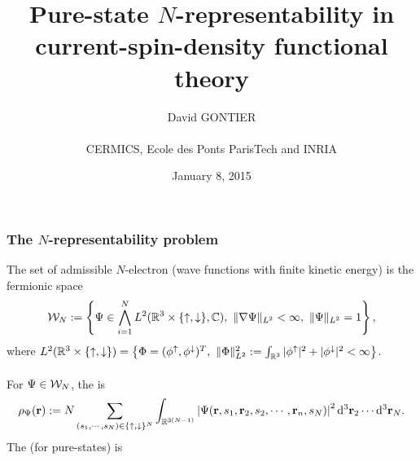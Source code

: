 \documentclass[9pt,xcolor=dvipsnames]{beamer}
\title[$N$-representability]{Pure-state $N$-representability in current-spin-density functional theory}
\author[David Gontier]{David GONTIER\\
~\\
CERMICS, Ecole des Ponts ParisTech and INRIA}
\date{January 8, 2015}
\begin{document}

\begin{frame} 
\titlepage
\end{frame} 



\begin{frame}

\frametitle{The $N$-representability problem}

The set of admissible $N$-electron  (wave functions with finite kinetic energy) is the fermionic space
\[
	{\mathcal W}_N := \left\{ \Psi \in \bigwedge_{i=1}^N L^2({\mathbb R}^3 \times \{ {\uparrow}, {\downarrow}\}, {\mathbb C}), \ \| \nabla \Psi \|_{L^2} < \infty, \  \| \Psi\|_{L^2} = 1 \right\},
\]
where $L^2({\mathbb R}^3 \times \{ {\uparrow}, {\downarrow}\} ) = \left\{ \Phi = (\phi^{\uparrow}, \phi^{\downarrow})^T, \  \| \Phi \|_{L^2}^2 := \int_{{\mathbb R}^3} | \phi^{\uparrow}|^2 + | \phi^{{\downarrow}}|^2 < \infty \right\}$. \\
~\\
For $\Psi \in {\mathcal W}_N$, the  is
\[
	\rho_{\Psi}({\bold r}) := N \sum_{(s_1, \cdots, s_N) \in \{ {\uparrow}, {\downarrow}\}^N} \int_{{\mathbb R}^{3(N-1)}} \left| \Psi ({\bold r}, s_1, {\bold r}_2, s_2, \cdots, {\bold r}_n, s_N) \right|^2 {\mathrm{d}}^3 {\bold r}_2 \cdots {\mathrm{d}}^3 {\bold r}_N.
\]
The  (for pure-states) is\\
\begin{center}
\end{center}


\end{frame}

\end{document}
